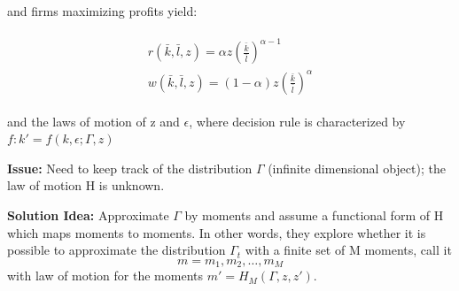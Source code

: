and firms maximizing profits yield:

\begin{align} \label{firms}
\begin{split}
r(\bar{k},\bar{l},z) = \alpha z (\frac{\bar{k}}{\bar{l}})^{\alpha-1} \\
w(\bar{k},\bar{l},z) = (1-\alpha) z (\frac{\bar{k}}{\bar{l}})^{\alpha}
\end{split}
\end{align}


and the laws of motion of z and $\epsilon$, where decision rule is characterized by $f: k' = f(k,\epsilon; \Gamma, z)$

\textbf{Issue:} Need to keep track of the distribution $\Gamma$ (infinite dimensional object); the law of motion H is unknown.

\textbf{Solution Idea:} Approximate $\Gamma$ by moments and assume a functional form of H which maps moments to moments. In other words, they explore whether it is possible to approximate the distribution $\Gamma_t$ with a finite set of M moments, call it $$m = {m_1,m_2, \dots, m_M}$$ with law of motion for the moments $m' =H_M (\Gamma, z,z')$.

